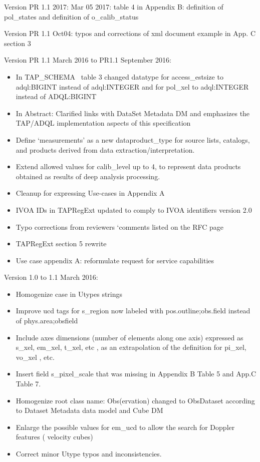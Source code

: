 \documentclass[11pt,a4paper]{ivoa}
\begin{document}
Version PR 1.1 2017: Mar 05 2017: table 4 in Appendix B: definition of pol\_states and definition of o\_calib\_status 

Version PR 1.1 Oct04: typos and corrections of xml document example in App. C section 3 

Version PR 1.1 March 2016 to PR1.1 September 2016: 

\begin{itemize}
\item In TAP\_SCHEMA~ table 3 changed datatype for access\_estsize to adql:BIGINT instead of adql:INTEGER and for
pol\_xel to adql:INTEGER instead of ADQL:BIGINT
\item In Abstract: Clarified links with DataSet Metadata DM and emphasizes the TAP/ADQL implementation aspects of this
specification
\item Define `measurements' as a new dataproduct\_type for source lists, catalogs, and products derived from data
extraction/interpretation.
\item Extend allowed values for calib\_level up to 4, to represent data products obtained as results of deep analysis
processing.
\item Cleanup for expressing Use-cases in Appendix A 
\item IVOA IDs in TAPRegExt updated to comply to IVOA identifiers version 2.0 
\item Typo corrections from reviewers `comments listed on the RFC page
\item TAPRegExt section 5 rewrite 
\item Use case appendix A: reformulate request for service capabilities 
\end{itemize}
Version 1.0 to 1.1 March 2016:

\begin{itemize}
\item Homogenize case in Utypes strings
\item Improve ucd tags for s\_region now labeled with pos.outline;obs.field instead of phys.area;obsfield
\item Include axes dimensions (number of elements along one axis) expressed as s\_xel, em\_xel, t\_xel, etc , as an
extrapolation of the definition for pi\_xel, vo\_xel , etc. 
\item Insert field s\_pixel\_scale that was missing in Appendix B Table 5 and App.C Table 7.
\item Homogenize root class name: Obs(ervation) changed to ObsDataset according to Dataset Metadata data model and Cube
DM
\item Enlarge the possible values for em\_ucd to allow the search for Doppler features ( velocity cubes)
\item Correct minor Utype typos and inconsistencies.
\end{itemize}
\end{document}
